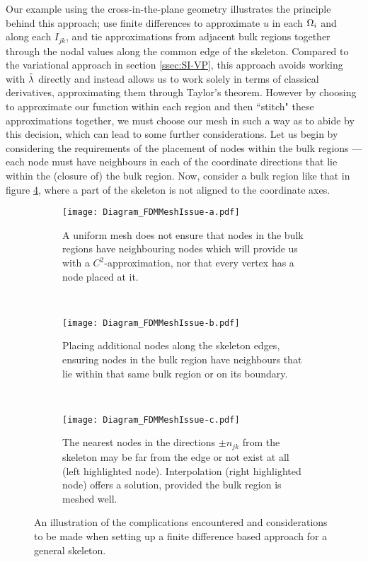 Our example using the cross-in-the-plane geometry illustrates the principle behind this approach; use finite differences to approximate $u$ in each $\Omega_i$ and along each $I_{jk}$, and tie approximations from adjacent bulk regions together through the nodal values along the common edge of the skeleton.
Compared to the variational approach in section \ref{ssec:SI-VP}, this approach avoids working with $\tilde{\lambda}$ directly and instead allows us to work solely in terms of classical derivatives, approximating them through Taylor's theorem.
However by choosing to approximate our function within each region and then ``stitch" these approximations together, we must choose our mesh in such a way as to abide by this decision, which can lead to some further considerations.
Let us begin by considering the requirements of the placement of nodes within the bulk regions --- each node must have neighbours in each of the coordinate directions that lie within the (closure of) the bulk region.
Now, consider a bulk region like that in figure \ref{fig:Diagram_FDMMeshIssue}, where a part of the skeleton is not aligned to the coordinate axes.
\begin{figure}[t]
	\centering
	\begin{subfigure}[t]{0.3\textwidth}
		\centering
		\texttt{[image: Diagram\_FDMMeshIssue-a.pdf]}
		\caption{\label{fig:Diagram_FDMMeshIssue-a} A uniform mesh does not ensure that nodes in the bulk regions have neighbouring nodes which will provide us with a $C^2$-approximation, nor that every vertex has a node placed at it.}
	\end{subfigure}
	~
	\begin{subfigure}[t]{0.3\textwidth}
		\centering
		\texttt{[image: Diagram\_FDMMeshIssue-b.pdf]}
		\caption{\label{fig:Diagram_FDMMeshIssue-b} Placing additional nodes along the skeleton edges, ensuring nodes in the bulk region have neighbours that lie within that same bulk region or on its boundary.}
	\end{subfigure}
	~
	\begin{subfigure}[t]{0.3\textwidth}
		\centering
		\texttt{[image: Diagram\_FDMMeshIssue-c.pdf]}
		\caption{\label{fig:Diagram_FDMMeshIssue-c} The nearest nodes in the directions $\pm n_{jk}$ from the skeleton may be far from the edge or not exist at all (left highlighted node). Interpolation (right highlighted node) offers a solution, provided the bulk region is meshed well.}
	\end{subfigure}
	\caption{\label{fig:Diagram_FDMMeshIssue} An illustration of the complications encountered and considerations to be made when setting up a finite difference based approach for a general skeleton.}
\end{figure}
